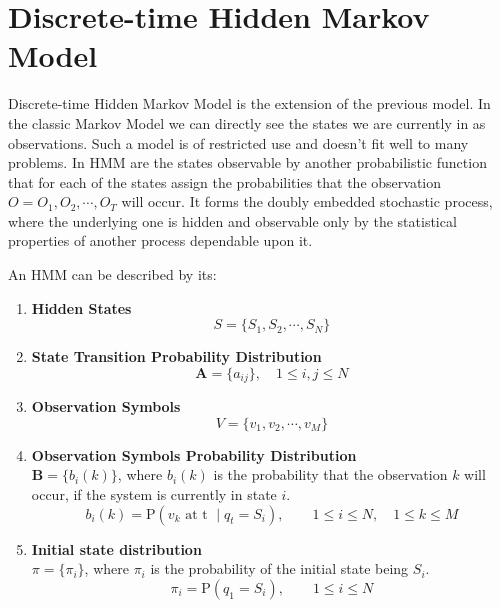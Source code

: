 \documentclass[thesis=M,english]{FITthesis}[2012/10/20]
\newcommand{\matr}[1]{\mathbf{#1}}
\begin{document}
\section{Discrete-time Hidden Markov Model}

Discrete-time Hidden Markov Model is the extension of the previous model. In the classic Markov Model we can directly see the states we are currently in as observations. Such a model is of restricted use and doesn't fit well to many problems. In HMM are the states observable by another probabilistic function that for each of the states assign the probabilities that the observation $O = O_1,O_2,\cdots,O_T$ will occur. It forms the doubly embedded stochastic process, where the underlying one is hidden and observable only by the statistical properties of another process dependable upon it.

An HMM can be described by its:

\begin{enumerate}[resume]
\setcounter{enumi}{0}
\item \textbf{Hidden States}
\begin{equation}
S = \{ S_1,S_2, \cdots, S_N \}
\end{equation} 
\item \textbf{State Transition Probability Distribution}
\begin{equation}
\matr{A} = \{ a_{ij} \}, \quad 1 \leq i,j \leq N
\end{equation} 
\item \textbf{Observation Symbols}
\begin{equation}
V = \{ v_1,v_2, \cdots, v_M \} 
\end{equation}
\item \textbf{Observation Symbols Probability Distribution} \\
$\matr{B} = \{ b_{i}(k) \}$, where $b_{i}(k)$ is the probability that the observation $k$ will occur, if the system is currently in state $i$. 
\begin{equation}
b_i(k) = \mathrm{P}(v_k \text{ at t } \mid q_t = S_i), \qquad 1 \leq i \leq N, \quad 1 \leq k \leq M
\end{equation}
\item \textbf{Initial state distribution} \\
$\pi = \{ \pi_i \}$, where $\pi_i$ is the probability of the initial state being $S_i$.
\begin{equation}
\pi_{i} = \mathrm{P}(q_1 = S_i), \qquad 1 \leq i \leq N
\end{equation}
\end{enumerate}
\end{document}
